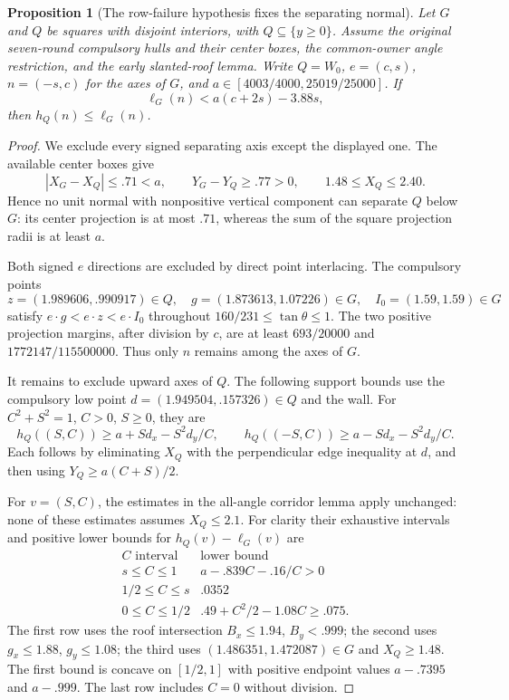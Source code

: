 \documentclass[11pt]{article}
\newtheorem{proposition}[theorem]{Proposition}
\begin{document}
\begin{proposition}[The row-failure hypothesis fixes the separating normal]
Let $G$ and $Q$ be squares with disjoint interiors, with
$Q\subseteq\{y\ge0\}$. Assume the original seven-round compulsory hulls
and their center boxes, the common-owner angle restriction, and the
early slanted-roof lemma.
Write $Q=W_0$, $e=(c,s)$, $n=(-s,c)$ for the axes of $G$, and
$a\in[4003/4000,25019/25000]$. If
\[
 \ell_G(n)<a(c+2s)-3.88s,
\]
then $h_Q(n)\le\ell_G(n)$.
\end{proposition}
\begin{proof}
We exclude every signed separating axis except the displayed one.
The available center boxes give
\[
 |X_G-X_Q|\le.71<a,\qquad Y_G-Y_Q\ge.77>0,
 \qquad 1.48\le X_Q\le2.40.
\]
Hence no unit normal with nonpositive vertical component can separate
$Q$ below $G$: its center projection is at most $.71$, whereas the
sum of the square projection radii is at least $a$.

Both signed $e$ directions are excluded by direct point interlacing.
The compulsory points
\[
 z=(1.989606,.990917)\in Q,\quad
 g=(1.873613,1.07226)\in G,\quad I_0=(1.59,1.59)\in G
\]
satisfy $e\cdot g<e\cdot z<e\cdot I_0$ throughout
$160/231\le\tan\theta\le1$. The two positive projection margins,
after division by $c$, are at least
$693/20000$ and $1772147/115500000$.
Thus only $n$ remains among the axes of $G$.

It remains to exclude upward axes of $Q$. The following support bounds
use the compulsory low point $d=(1.949504,.157326)\in Q$ and the wall.
For $C^2+S^2=1$, $C>0$, $S\ge0$, they are
\[
 h_Q((S,C))\ge a+Sd_x-S^2d_y/C,\qquad
 h_Q((-S,C))\ge a-Sd_x-S^2d_y/C.
\]
Each follows by eliminating $X_Q$ with the perpendicular edge inequality
at $d$, and then using $Y_Q\ge a(C+S)/2$.

For $v=(S,C)$, the estimates in the all-angle corridor lemma apply
unchanged: none of these estimates assumes $X_Q\le2.1$.
For clarity their exhaustive intervals and positive lower bounds for
$h_Q(v)-\ell_G(v)$ are
\[
\begin{array}{c|c}
 C\text{ interval}&\text{lower bound}\\\hline
 s\le C\le1&a-.839C-.16/C>0\\
 1/2\le C\le s&.0352\\
 0\le C\le1/2&.49+C^2/2-1.08C\ge.075.
\end{array}
\]
The first row uses the roof intersection $B_x\le1.94$, $B_y<.999$;
the second uses $g_x\le1.88$, $g_y\le1.08$; the third uses
$(1.486351,1.472087)\in G$ and $X_Q\ge1.48$.
The first bound is concave on $[1/2,1]$ with positive endpoint values
$a-.7395$ and $a-.999$. The last row includes $C=0$ without division.


\end{proof}
\end{document}
